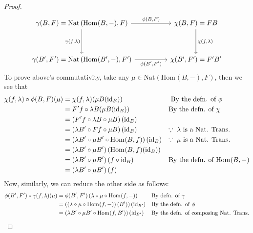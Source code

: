 \documentclass{article}
\theoremstyle{definition}
\theoremstyle{remark}
\theoremstyle{definition}
\theoremstyle{definition}
\theoremstyle{definition}
\newcommand{\Id}[1]{\text{id}_{#1}}
\newcommand{\homset}[3]{\text{Hom}_{#1}(#2,#3)}
\newcommand{\Nat}[2]{\text{Nat}\left (#1,#2\right )}
\begin{document}
\begin{proof}
	 \begin{equation}\label{Eq-3}
	 	\begin{tikzcd}
	 		{\gamma(B,F) = \Nat{\homset{}{B}{-}}{F}} && {\chi(B,F) = FB} \\
	 		\\
	 		{\gamma(B^\prime,F^\prime) = \Nat{\homset{}{B^\prime}{-}}{F^\prime}} && {\chi(B^\prime,F^\prime) = F^\prime B^\prime}
	 		\arrow["{\phi(B,F)}", from=1-1, to=1-3]
	 		\arrow["{\phi(B^\prime,F^\prime)}"', from=3-1, to=3-3]
	 		\arrow["{\gamma(f,\lambda)}"', from=1-1, to=3-1]
	 		\arrow["{\chi(f,\lambda)}", from=1-3, to=3-3]
	 	\end{tikzcd}
	 \end{equation}
 To prove above's commutativity, take any $ \mu \in \Nat{\homset{}{B}{-}}{F} $, then we see that
 \begin{align*}
 	\chi(f,\lambda)\circ \phi(B,F) (\mu) &=  \chi(f,\lambda)(\mu B(\Id{B}))&&\text{ By the defn. of $ \phi $}\\
 	&=F^{\prime} f \circ \lambda B (\mu B(\Id{B})) &&\text{By the defn. of $ \chi $}\\
 	&=\left ( F^\prime f \circ \lambda B \circ \mu B \right ) (\Id{B})&&\\
 	&= \left (\lambda B^{\prime} \circ Ff \circ \mu B\right )(\Id{B}) && \text{$ \because \;\lambda $ is a Nat. Trans.}\\
 	&=\left (\lambda B^{\prime} \circ \mu B^{\prime} \circ \homset{}{B}{f}\right )(\Id{B})&& \text{$ \because \;\mu$ is a Nat. Trans.}\\
 	&= \left (\lambda B^{\prime } \circ \mu B^{\prime} \right ) (\homset{}{B}{f} (\Id{B}))\\
 	&= \left (\lambda B^{\prime } \circ \mu B^{\prime} \right ) (f\circ \Id{B})&&\text{By the defn. of $ \homset{}{B}{-} $}\\
 	&= \left (\lambda B^{\prime } \circ \mu B^{\prime} \right )(f)
 \end{align*}
  Now, similarly, we can reduce the other side as follows:
  \begin{align*}
  	\phi(B^{\prime}, F^{\prime}) \circ \gamma (f,\lambda) (\mu)&= \phi(B^{\prime}, F^{\prime}) \left (\lambda \circ \mu \circ \homset{}{f}{-}\right )&& \text{By defn. of $ \gamma $}\\
  	&= \left (\left (\lambda \circ \mu \circ \homset{}{f}{-}\right )(B^{\prime})\right )(\Id{B^{\prime}})&&\text{By the defn. of $ \phi $}\\
  	&= \left (\lambda B^{\prime} \circ \mu B^{\prime} \circ \homset{}{f}{B^{\prime}}\right ) (\Id{B^{\prime}}) && \text{By the defn. of composing Nat. Trans.}\\

\end{align*}
\end{proof}
\end{document}
